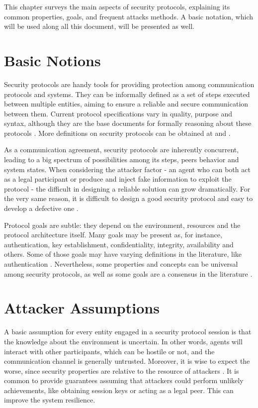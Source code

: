 \label{chap:sec-protocols}
This chapter surveys the main aspects of security protocols, explaining its common properties, goals, and frequent attacks methods. A basic notation, which will be used along all this document, will be presented as well.





\section{Basic Notions}
Security protocols are handy tools for providing protection among communication protocols and systems. They can be informally defined as a set of steps executed between multiple entities, aiming to ensure a reliable and secure communication between them. Current protocol specifications vary in quality, purpose and syntax, although they are the base documents for formally reasoning about these protocols \cite{Abadi99}. More definitions on security protocols can be obtained at \cite{BoydMathuria2008} and \cite{RyanSchneider2010}.

As a communication agreement, security protocols are inherently concurrent, leading to a big spectrum of possibilities among its steps, peers behavior and system states. When considering the attacker factor - an agent who can both act as a legal participant or produce and inject fake information to exploit the protocol - the difficult in designing a reliable solution can grow dramatically. For the very same reason, it is difficult to design a good security protocol and easy to develop a defective one \cite{Bella2007}.

Protocol goals are subtle: they depend on the environment, resources and the protocol architecture itself. Many goals may be present as, for instance, authentication, key establishment, confidentiality, integrity, availability and others. Some of those goals may have varying definitions in the literature, like authentication \cite{Abadi99}. Nevertheless, some properties and concepts can be universal among security protocols, as well as some goals are a consensus in the literature \cite{RyanSchneider2010}.





\section{Attacker Assumptions}
A basic assumption for every entity engaged in a security protocol session is that the knowledge about the environment is uncertain. In other words, agents will interact with other participants, which can be hostile or not, and the communication channel is generally untrusted. Moreover, it is wise to expect the worse, since security properties are relative to the resource of attackers \cite{BoydMathuria2008}. It is common to provide guarantees assuming that attackers could perform unlikely achievements, like obtaining session keys or acting as a legal peer. This can improve the system resilience.

